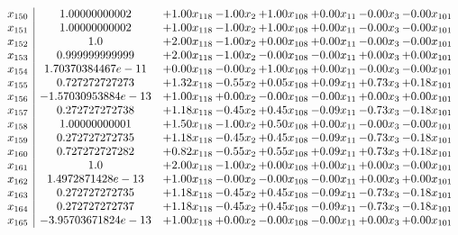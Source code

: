 \documentclass[8pt]{article}
\begin{document}
\[\begin{array}{c| c c@{\hskip 2pt} c@{\hskip 2pt} c@{\hskip 2pt} c@{\hskip 2pt} c@{\hskip 2pt} c@{\hskip 2pt} }
 x_{150}   &  1.00000000002 & +  1.00 x_{118} & -1.00 x_{2} & +  1.00 x_{108} & +  0.00 x_{11} & -0.00 x_{3} & -0.00 x_{101}\\
 x_{151}   &  1.00000000002 & +  1.00 x_{118} & -1.00 x_{2} & +  1.00 x_{108} & +  0.00 x_{11} & -0.00 x_{3} & -0.00 x_{101}\\
 x_{152}   &  1.0 & +  2.00 x_{118} & -1.00 x_{2} & +  0.00 x_{108} & +  0.00 x_{11} & -0.00 x_{3} & -0.00 x_{101}\\
 x_{153}   &  0.999999999999 & +  2.00 x_{118} & -1.00 x_{2} & -0.00 x_{108} & -0.00 x_{11} & +  0.00 x_{3} & +  0.00 x_{101}\\
 x_{154}   &  1.70370384467e-11 & +  0.00 x_{118} & -0.00 x_{2} & +  1.00 x_{108} & +  0.00 x_{11} & -0.00 x_{3} & -0.00 x_{101}\\
 x_{155}   &  0.727272727273 & +  1.32 x_{118} & -0.55 x_{2} & +  0.05 x_{108} & +  0.09 x_{11} & +  0.73 x_{3} & +  0.18 x_{101}\\
 x_{156}   &  -1.57030953884e-13 & +  1.00 x_{118} & +  0.00 x_{2} & -0.00 x_{108} & -0.00 x_{11} & +  0.00 x_{3} & +  0.00 x_{101}\\
 x_{157}   &  0.272727272738 & +  1.18 x_{118} & -0.45 x_{2} & +  0.45 x_{108} & -0.09 x_{11} & -0.73 x_{3} & -0.18 x_{101}\\
 x_{158}   &  1.00000000001 & +  1.50 x_{118} & -1.00 x_{2} & +  0.50 x_{108} & +  0.00 x_{11} & -0.00 x_{3} & -0.00 x_{101}\\
 x_{159}   &  0.272727272735 & +  1.18 x_{118} & -0.45 x_{2} & +  0.45 x_{108} & -0.09 x_{11} & -0.73 x_{3} & -0.18 x_{101}\\
 x_{160}   &  0.727272727282 & +  0.82 x_{118} & -0.55 x_{2} & +  0.55 x_{108} & +  0.09 x_{11} & +  0.73 x_{3} & +  0.18 x_{101}\\
 x_{161}   &  1.0 & +  2.00 x_{118} & -1.00 x_{2} & +  0.00 x_{108} & +  0.00 x_{11} & +  0.00 x_{3} & -0.00 x_{101}\\
 x_{162}   &  1.4972871428e-13 & +  1.00 x_{118} & -0.00 x_{2} & -0.00 x_{108} & -0.00 x_{11} & +  0.00 x_{3} & +  0.00 x_{101}\\
 x_{163}   &  0.272727272735 & +  1.18 x_{118} & -0.45 x_{2} & +  0.45 x_{108} & -0.09 x_{11} & -0.73 x_{3} & -0.18 x_{101}\\
 x_{164}   &  0.272727272737 & +  1.18 x_{118} & -0.45 x_{2} & +  0.45 x_{108} & -0.09 x_{11} & -0.73 x_{3} & -0.18 x_{101}\\
 x_{165}   &  -3.95703671824e-13 & +  1.00 x_{118} & +  0.00 x_{2} & -0.00 x_{108} & -0.00 x_{11} & +  0.00 x_{3} & +  0.00 x_{101}\\

\end{array}\]
\end{document}
